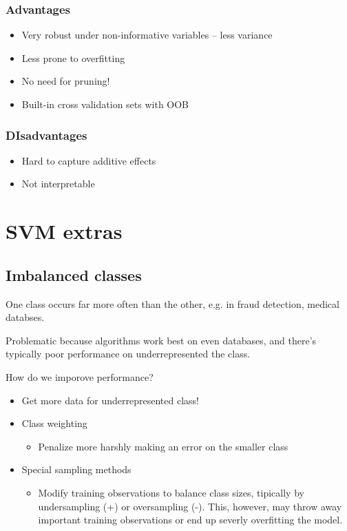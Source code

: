 \documentclass[11pt]{article}
\begin{document}
\subsubsection*{Advantages}
\label{sec-1-5-2}
\begin{itemize}
\item Very robust under non-informative variables -- less variance
\item Less prone to overfitting
\item No need for pruning!
\item Built-in cross validation sets with OOB
\end{itemize}
\subsubsection*{DIsadvantages}
\label{sec-1-5-3}
\begin{itemize}
\item Hard to capture additive effects
\item Not interpretable
\end{itemize}
\section*{SVM extras}
\label{sec-2}
\subsection*{Imbalanced classes}
\label{sec-2-1}
One class occurs far more often than the other, e.g. in fraud detection, medical databses.

Problematic because algorithms work best on even databases, and there's typically poor performance on underrepresented the class.

How do we imporove performance?
\begin{itemize}
\item Get more data for underrepresented class!
\item Class weighting
\begin{itemize}
\item Penalize more harshly making an error on the smaller class
\end{itemize}
\item Special sampling methods
\begin{itemize}
\item Modify training observations to balance class sizes, tipically by undersampling (+) or oversampling (-). This, however, may throw away important training observations or end up severly overfitting the model.
\end{itemize}
\end{itemize}
\end{document}
